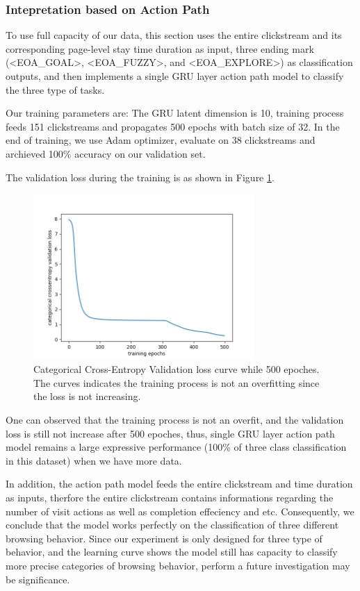 \subsubsection{Intepretation based on Action Path}

To use full capacity of our data, this section uses the entire clickstream and its corresponding
page-level stay time duration as input, three ending mark (<EOA\_GOAL>, <EOA\_FUZZY>, and <EOA\_EXPLORE>) 
as classification outputs, and then implements a single GRU layer action path model 
to classify the three type of tasks.

Our training parameters are: 
The GRU latent dimension is 10, training process feeds 151 clickstreams and 
propagates 500 epochs with batch size of 32.
In the end of training, we use Adam optimizer, evaluate on 38 clickstreams and 
archieved 100\% accuracy on our validation set.

The validation loss during the training is as shown in Figure \ref{fig:class-loss}.

\begin{figure}[H]
    \centering
    \includegraphics[width=0.75\textwidth]{figures/class-loss}
    \caption{Categorical Cross-Entropy Validation loss curve while 500 epoches. 
    The curves indicates the training process is not an overfitting since the loss is not increasing.}
    \label{fig:class-loss}
\end{figure}

One can observed that the training process is not an overfit, and the validation loss is 
still not increase after 500 epoches, thus, single GRU layer action path model 
remains a large expressive performance (100\% of three class classification in this dataset) 
when we have more data.

In addition, the action path model feeds the entire clickstream and time duration as inputs, 
therfore the entire clickstream contains informations regarding the number of visit actions
as well as completion effeciency and etc. Consequently, we conclude that the model works
perfectly on the classification of three different browsing behavior. Since our experiment is
only designed for three type of behavior, and the learning curve
shows the model still has capacity to classify more precise categories of browsing behavior,
perform a future investigation may be significance.

